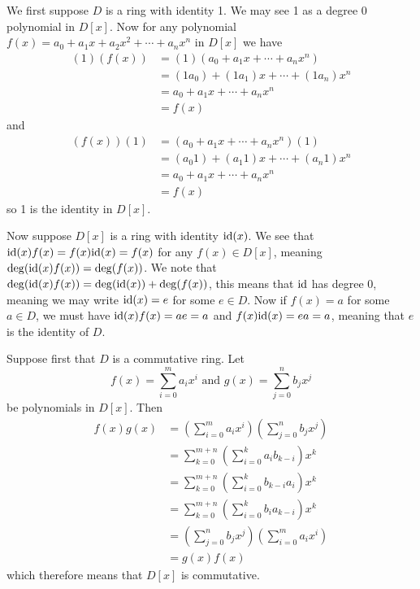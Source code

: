 \begin{questions}
    \item \begin{partquestions}{\alph*}
        \item We first suppose $D$ is a ring with identity 1. We may see 1 as a degree 0 polynomial in $D[x]$. Now for any polynomial $f(x) = a_0+a_1x+a_2x^2+\cdots+a_nx^n$ in $D[x]$ we have
        \begin{align*}
            (1)(f(x)) &= (1)(a_0+a_1x+\cdots+a_nx^n)\\
            &= (1a_0)+(1a_1)x+\cdots+(1a_n)x^n\\
            &= a_0+a_1x+\cdots+a_nx^n\\
            &= f(x)
        \end{align*}
        and
        \begin{align*}
            (f(x))(1) &= (a_0+a_1x+\cdots+a_nx^n)(1)\\
            &= (a_{0}1)+(a_{1}1)x+\cdots+(a_{n}1)x^n\\
            &= a_0+a_1x+\cdots+a_nx^n\\
            &= f(x)
        \end{align*}
        so 1 is the identity in $D[x]$.

        Now suppose $D[x]$ is a ring with identity $\mathrm{id}(x)$. We see that $\mathrm{id}(x)f(x) = f(x)\mathrm{id}(x) = f(x)$ for any $f(x) \in D[x]$, meaning $\deg(\mathrm{id}(x)f(x)) = \deg(f(x))$. We note that $\deg(\mathrm{id}(x)f(x)) = \deg(\mathrm{id}(x)) + \deg(f(x))$, this means that $\mathrm{id}$ has degree 0, meaning we may write $\mathrm{id}(x) = e$ for some $e \in D$. Now if $f(x) = a$ for some $a \in D$, we must have $\mathrm{id}(x)f(x) = ae = a$ and $f(x)\mathrm{id}(x) = ea = a$, meaning that $e$ is the identity of $D$.
        
        \item Suppose first that $D$ is a commutative ring. Let
        \[
            f(x) = \sum_{i=0}^ma_ix^i \text{ and } g(x) = \sum_{j=0}^nb_jx^j
        \]
        be polynomials in $D[x]$. Then
        \begin{align*}
            f(x)g(x) &= \left(\sum_{i=0}^ma_ix^i\right)\left(\sum_{j=0}^nb_jx^j\right)\\
            &= \sum_{k=0}^{m+n}\left(\sum_{i=0}^k a_{i}b_{k-i}\right)x^k\\
            &= \sum_{k=0}^{m+n}\left(\sum_{i=0}^k b_{k-i}a_{i}\right)x^k\\
            &= \sum_{k=0}^{m+n}\left(\sum_{i=0}^k b_{i}a_{k-i}\right)x^k\\
            &= \left(\sum_{j=0}^nb_jx^j\right)\left(\sum_{i=0}^ma_ix^i\right)\\
            &= g(x)f(x)
        \end{align*}
        which therefore means that $D[x]$ is commutative.


\end{partquestions}
\end{questions}
